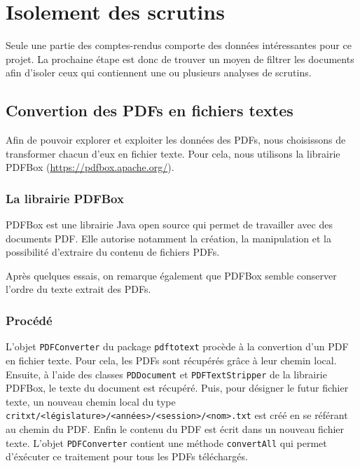 \section{Isolement des scrutins}

Seule une partie des comptes-rendus comporte des données intéressantes pour ce projet. La prochaine étape est donc de trouver un moyen de filtrer les documents afin d'isoler ceux qui contiennent une ou plusieurs analyses de scrutins.

\subsection{Convertion des PDFs en fichiers textes}

Afin de pouvoir explorer et exploiter les données des PDFs, nous choisissons de transformer chacun d'eux en fichier texte. Pour cela, nous utilisons la librairie PDFBox (\url{https://pdfbox.apache.org/}).

\subsubsection*{La librairie PDFBox}

PDFBox est une librairie Java open source qui permet de travailler avec des documents PDF. Elle autorise notamment la création, la manipulation et la possibilité d'extraire du contenu de fichiers PDFs.

Après quelques essais, on remarque également que PDFBox semble conserver l'ordre du texte extrait des PDFs.

\subsubsection*{Procédé}

L'objet \verb|PDFConverter| du package \verb|pdftotext| procède à la convertion d'un PDF en fichier texte.\newline
Pour cela, les PDFs sont récupérés grâce à leur chemin local. Ensuite, à l'aide des classes \verb|PDDocument| et \verb|PDFTextStripper| de la librairie PDFBox, le texte du document est récupéré. Puis, pour désigner le futur fichier texte, un nouveau chemin local du type \verb|critxt/<législature>/<années>/<session>/<nom>.txt| est créé en se référant au chemin du PDF. Enfin le contenu du PDF est écrit dans un nouveau fichier texte. L'objet \verb|PDFConverter| contient une méthode \verb|convertAll| qui permet d'éxécuter ce traitement pour tous les PDFs téléchargés.


